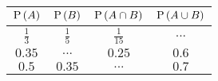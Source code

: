 \begin{tabular}{|c|c|c|c|} 
\hline
\textbf{$\text{P}\left(A\right)$} & \textbf{$\text{P}\left(B\right)$} & \textbf{$\text{P}\left(A \cap B\right)$} & \textbf{$\text{P}\left(A \cup B\right)$} \\
\hline
$\frac{1}{3}$ & $\frac{1}{5}$ & $\frac{1}{15}$ & $...$ \\
\hline
$0.35$ & $...$ & $0.25$ & $0.6$ \\
\hline
$0.5$ & $0.35$ & $...$ & $0.7$ \\
\hline
\end{tabular}